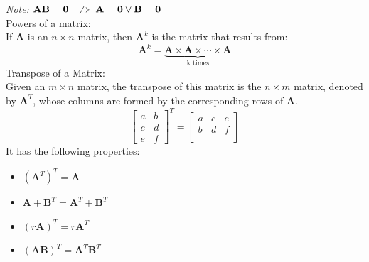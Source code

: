 \documentclass[nobib]{tufte-handout}
\begin{document}
\textit{Note: $\mathbf{AB=0} \centernot\implies \mathbf{A=0}\lor \mathbf{B=0} $}\\
Powers of a matrix:\\
If \textbf{A} is an $n\times n$ matrix, then $\mathbf{A}^k$ is the matrix that results from: 
\begin{equation*}
    \mathbf{A}^k = \underbrace{\mathbf{A} \times \mathbf{A} \times \cdots \times \mathbf{A}}_{\text{k times}}
\end{equation*}
Transpose of a Matrix:\\
Given an $m\times n$ matrix, the transpose of this matrix is the $n\times m$ matrix, denoted by $\mathbf{A}^T$, whose columns are formed by the corresponding rows of \textbf{A}.
\begin{equation*}
    \begin{bmatrix}
        a & b\\
        c & d\\
        e & f
    \end{bmatrix}^T
    =
    \begin{bmatrix}
        a & c & e\\
        b & d & f\\
    \end{bmatrix}
\end{equation*}
It has the following properties:
\begin{itemize}
    \item $(\mathbf{A}^{T})^T = \mathbf{A}$
    \item $\mathbf{A+B}^{T} = \mathbf{A}^T+\mathbf{B}^T$
    \item $(r\mathbf{A})^{T} = r\mathbf{A}^T$
    \item $(\mathbf{AB})^{T} = \mathbf{A}^T\mathbf{B}^T$
\end{itemize}
\end{document}
